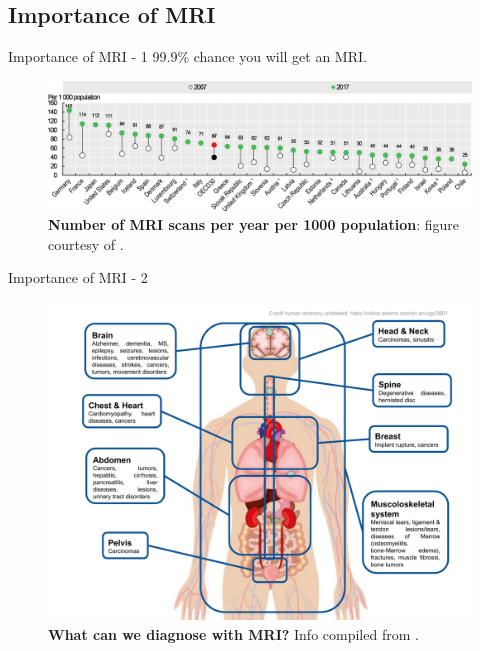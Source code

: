 \subsection{Importance of MRI}
\begin{frame}{Importance of MRI - 1}
    99.9\% chance you will get an MRI.
    \begin{figure}
        \centering
        \includegraphics[width=\textwidth]{Figures/intro_figures/num_mri_scans.png}
        \caption{\label{fig:num-mri-scans} \textbf{Number of MRI scans per year per 1000 population}: figure courtesy of \citet{OECDMRI}.}
    \end{figure}
\end{frame}

\begin{frame}{Importance of MRI - 2}
    \begin{figure}
        \centering
        \includegraphics[height=0.6\textheight]{Figures/intro_figures/What_can_we_diagnose_with_MRI.pdf}
        \caption{\label{fig:diagnose-mri} \textbf{What can we diagnose with MRI?}  Info compiled from \citet{reimer2010clinical,runge2019essentials}.}
    \end{figure}
\end{frame}

